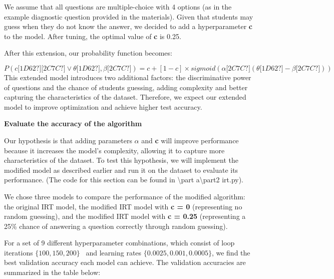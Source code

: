 \documentclass[letterpaper]{article}
\begin{document}
We assume that all questions are multiple-choice with 4 options (as in the example diagnostic question provided in the
materials). Given that students may guess when they do not know the answer, we decided to add a hyperparameter
\textbf{c} to the model. After tuning, the optimal value of \textbf{c} is 0.25.

After this extension, our probability function becomes:

\begin{equation*}
P(\mathit{c\text{[1D62?]}\text{[2C7C?]}}\vee \mathit{\theta \text{[1D62?]}},\mathit{\beta \text{[2C7C?]}})=c+[1-c]\times
\mathit{sigmoid}(\mathit{\alpha \text{[2C7C?]}}(\mathit{\theta \text{[1D62?]}}-\mathit{\beta \text{[2C7C?]}}))
\end{equation*}
This extended model introduces two additional factors: the discriminative power of questions and the chance of students
guessing, adding complexity and better capturing the characteristics of the dataset. Therefore, we expect our extended
model to improve optimization and achieve higher test accuracy.


\bigskip


\bigskip

\textbf{Evaluate the accuracy of the algorithm}

Our hypothesis is that adding parameters \textbf{$\alpha $} and \textbf{c} will improve performance because it increases
the model's complexity, allowing it to capture more characteristics of the dataset. To test this hypothesis, we will
implement the modified model as described earlier and run it on the dataset to evaluate its performance. (The code for
this section can be found in {\textbackslash}part a{\textbackslash}part2 irt.py).

We chose three models to compare the performance of the modified algorithm: the original IRT model, the modified IRT
model with \textbf{c = 0} (representing no random guessing), and the modified IRT model with \textbf{c = 0.25}
(representing a 25\% chance of answering a question correctly through random guessing).

For a set of 9 different hyperparameter combinations, which consist of loop iterations  $\{100,150,200\}$ \ and learning
rates  $\{0.0025,0.001,0.0005\}$, we find the best validation accuracy each model can achieve. The validation
accuracies are summarized in the table below: 


\bigskip
\end{document}
